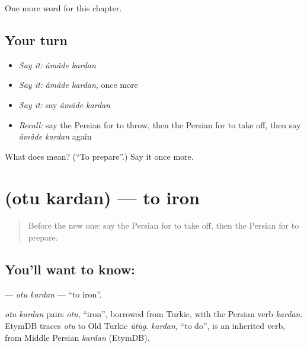 \begin{grammarlens}[title={What you've built}]
One more word for this chapter.
\end{grammarlens}

\subsection*{Your turn}
\begin{itemize}
\raggedright
  \item \emph{Say it:} \emph{âmâde kardan}
  \item \emph{Say it:} \emph{âmâde kardan}, once more
  \item \emph{Say it:} say \emph{âmâde kardan}
  \item \emph{Recall:} say the Persian for to throw, then the Persian for to take off, then say \emph{âmâde kardan} again
\end{itemize}

\begin{tcolorbox}[breakable,colback=teal!4,colframe=teal!35!black,title={Before you move on}]
What does   mean? (\textquotedblleft{}To prepare\textquotedblright{}.) Say it once more.
\end{tcolorbox}
\section[\texorpdfstring{\fa{اتو} \fa{کردن} (otu kardan)}{اتو کردن (otu kardan)}]{  (otu kardan) — to iron}

\label{lesson:FA-C254-otu-kardan}



\begin{quote}
Before the new one: say the Persian for to take off, then the Persian for to prepare.
\end{quote}

\subsection*{You'll want to know:  }
\textbf{ } — \emph{otu kardan} — \textquotedblleft{}to iron\textquotedblright{}.

\begin{cousinweb}
\emph{otu kardan} pairs \emph{otu}, \textquotedblleft{}iron\textquotedblright{}, borrowed from Turkic, with the Persian verb \emph{kardan}. EtymDB traces \emph{otu} to Old Turkic \emph{ütüg}. \emph{kardan}, \textquotedblleft{}to do\textquotedblright{}, is an inherited verb, from Middle Persian \emph{kardan} (EtymDB).
\end{cousinweb}

